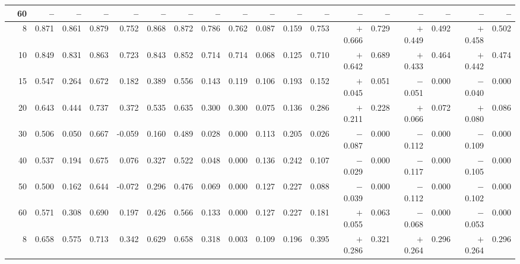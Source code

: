 \documentclass[conference]{IEEEtran}
\theoremstyle{remark}
\begin{document}
\begin{table}[ht]
{\begin{tabular}{p{1.55cm}r rrrr rr rr rr r rr rr rr}
  & 60 & -- & -- & -- & -- & -- & -- & -- & -- & -- & -- & -- & -- & -- & -- & -- & -- & -- \\
\midrule
{}
  & 8 & 0.871 & 0.861 & 0.879 & 0.752 & 0.868 & 0.872 & 0.786 & 0.762 & 0.087 & 0.159 & 0.753 & $+$0.666 & 0.729 & $+$0.449 & 0.492 & $+$0.458 & 0.502 \\
  & 10 & 0.849 & 0.831 & 0.863 & 0.723 & 0.843 & 0.852 & 0.714 & 0.714 & 0.068 & 0.125 & 0.710 & $+$0.642 & 0.689 & $+$0.433 & 0.464 & $+$0.442 & 0.474 \\
  & 15 & 0.547 & 0.264 & 0.672 & 0.182 & 0.389 & 0.556 & 0.143 & 0.119 & 0.106 & 0.193 & 0.152 & $+$0.045 & 0.051 & $-$0.051 & 0.000 & $-$0.040 & 0.000 \\
  & 20 & 0.643 & 0.444 & 0.737 & 0.372 & 0.535 & 0.635 & 0.300 & 0.300 & 0.075 & 0.136 & 0.286 & $+$0.211 & 0.228 & $+$0.066 & 0.072 & $+$0.080 & 0.086 \\
  & 30 & 0.506 & 0.050 & 0.667 & -0.059 & 0.160 & 0.489 & 0.028 & 0.000 & 0.113 & 0.205 & 0.026 & $-$0.087 & 0.000 & $-$0.112 & 0.000 & $-$0.109 & 0.000 \\
  & 40 & 0.537 & 0.194 & 0.675 & 0.076 & 0.327 & 0.522 & 0.048 & 0.000 & 0.136 & 0.242 & 0.107 & $-$0.029 & 0.000 & $-$0.117 & 0.000 & $-$0.105 & 0.000 \\
  & 50 & 0.500 & 0.162 & 0.644 & -0.072 & 0.296 & 0.476 & 0.069 & 0.000 & 0.127 & 0.227 & 0.088 & $-$0.039 & 0.000 & $-$0.112 & 0.000 & $-$0.102 & 0.000 \\
  & 60 & 0.571 & 0.308 & 0.690 & 0.197 & 0.426 & 0.566 & 0.133 & 0.000 & 0.127 & 0.227 & 0.181 & $+$0.055 & 0.063 & $-$0.068 & 0.000 & $-$0.053 & 0.000 \\
\midrule
{}
  & 8 & 0.658 & 0.575 & 0.713 & 0.342 & 0.629 & 0.658 & 0.318 & 0.003 & 0.109 & 0.196 & 0.395 & $+$0.286 & 0.321 & $+$0.264 & 0.296 & $+$0.264 & 0.296 \\

\end{tabular}}
\end{table}
\end{document}
